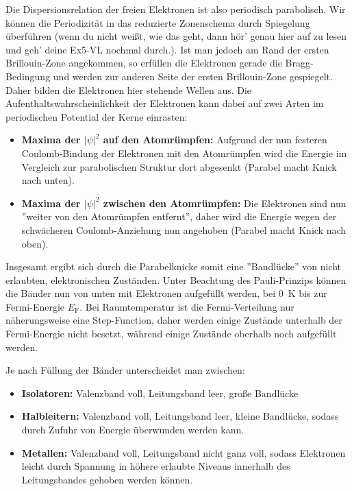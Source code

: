 Die Dispersionsrelation der freien Elektronen ist also periodisch parabolisch.
Wir können die Periodizität in das reduzierte Zonenschema durch Spiegelung überführen (wenn du nicht weißt, wie das geht, dann hör' genau hier auf zu lesen und geh' deine Ex5-VL nochmal durch.).
Ist man jedoch am Rand der ersten Brillouin-Zone angekommen, so erfüllen die Elektronen gerade die Bragg-Bedingung und werden zur anderen Seite der ersten Brillouin-Zone gespiegelt.
Daher bilden die Elektronen hier stehende Wellen aus.
Die Aufenthaltswahrscheinlichkeit der Elektronen kann dabei auf zwei Arten im periodischen Potential der Kerne einrasten:
\begin{itemize}
	\item \textbf{Maxima der $|\psi|^2$ auf den Atomrümpfen:} Aufgrund der nun festeren Coulomb-Bindung der Elektronen mit den Atomrümpfen wird die Energie im Vergleich zur parabolischen Struktur dort abgesenkt (Parabel macht Knick nach unten).
	\item \textbf{Maxima der $|\psi|^2$ zwischen den Atomrümpfen:} Die Elektronen sind nun ''weiter von den Atomrümpfen entfernt'', daher wird die Energie wegen der schwächeren Coulomb-Anziehung nun angehoben (Parabel macht Knick nach oben).
\end{itemize}

Insgesamt ergibt sich durch die Parabelknicke somit eine ''Bandlücke'' von nicht erlaubten, elektronischen Zuständen.
Unter Beachtung des Pauli-Prinzips können die Bänder nun von unten mit Elektronen aufgefüllt werden, bei \SI{0}{\kelvin} bis zur Fermi-Energie $E_\text{F}$.
Bei Raumtemperatur ist die Fermi-Verteilung nur näherungsweise eine Step-Function, daher werden einige Zustände unterhalb der Fermi-Energie nicht besetzt, während einige Zustände oberhalb noch aufgefüllt werden.

Je nach Füllung der Bänder unterscheidet man zwischen:
\begin{itemize}
	\item \textbf{Isolatoren:} Valenzband voll, Leitungsband leer, große Bandlücke
	\item \textbf{Halbleitern:} Valenzband voll, Leitungsband leer, kleine Bandlücke, sodass durch Zufuhr von Energie überwunden werden kann.
	\item \textbf{Metallen:} Valenzband voll, Leitungsband nicht ganz voll, sodass Elektronen leicht durch Spannung in höhere erlaubte Niveaus innerhalb des Leitungsbandes gehoben werden können.
\end{itemize}

